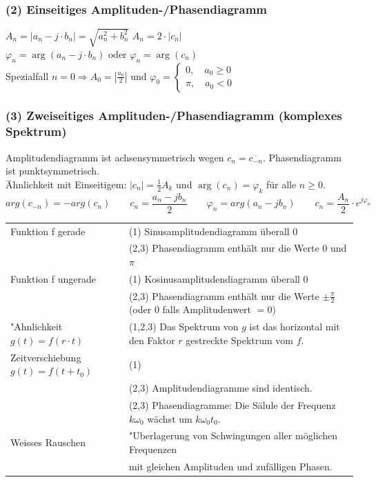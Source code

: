 \subsubsection{(2) Einseitiges Amplituden-/Phasendiagramm} 
$A_n = |a_n - j \cdot b_n| = \sqrt{a_n^2 + b_n^2}$  $A_n = 2 \cdot |c_n| \qquad$
$\varphi_n = \arg(a_n - j \cdot b_n) \text{ oder } \varphi_n = \arg(c_n) $ \\
Spezialfall $n=0 \Rightarrow A_0 = |\frac{a_0}{2}| \text{ und } \varphi_0 = \left\{
		\begin{array}{l} 
			0, \quad a_0 \geq 0\\
			\pi, \quad a_0 < 0  
		\end{array}
	    \right. $\\


\subsubsection{(3) Zweiseitiges Amplituden-/Phasendiagramm (komplexes Spektrum)} 
Amplitudendiagramm ist achsensymmetrisch wegen $ c_n=\overline{c_{-n}} $. Phasendiagramm ist punktsymmetrisch. \\
Ähnlichkeit mit Einseitigem: $|c_n| = \frac{1}{2}A_k $ und $\arg(c_n) = \varphi_k$ für alle $ n \geq 0$.\\
$$arg(c_{-n}) = -arg(c_n) \qquad c_n = \frac{a_n - jb_n}{2} \qquad \varphi_n = arg(a_n - jb_n) \qquad c_n = \frac{A_n}{2} \cdot e^{j\varphi_n}$$


\begin{tabular}{ll}
	Funktion f gerade 
	& (1) Sinusamplitudendiagramm überall 0 \\
	& (2,3) Phasendiagramm enthält nur die Werte $0$ und $\pi$ \\
	Funktion f ungerade
	& (1) Kosinusamplitudendiagramm überall 0 \\
	& (2,3) Phasendiagramm enthält nur die Werte $\pm \frac{\pi}{2}$ (oder $0$ falls Amplitudenwert $=0$) \\
	"Ahnlichkeit $g(t) = f(r \cdot t) $
	& (1,2,3) Das Spektrum von $g$ ist das horizontal mit den Faktor $r$ gestreckte Spektrum vom $f$. \\
	Zeitverschiebung $g(t) = f(t + t_0) $
	& (1) \verweis{Fourier_Zeitverschiebung}{Zeitverschiebung} \\
	& (2,3) Amplitudendiagramme sind identisch. \\
	& (2,3) Phasendiagramme: Die Sälule der Frequenz $k \omega_0$ wächst um $k\omega_0 t_0$. \\
	Weisses Rauschen
	& "Uberlagerung von Schwingungen aller möglichen Frequenzen \\
	& mit gleichen Amplituden und zufälligen Phasen. 

\end{tabular}


